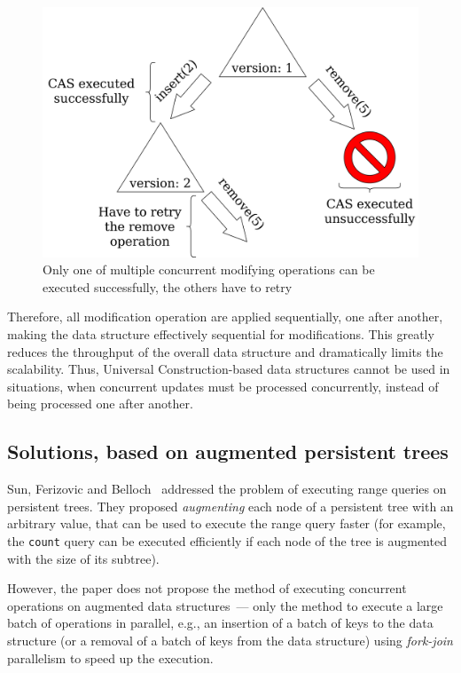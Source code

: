 \documentclass[times, dvipsnames,%
               languages={russian,english} %
              ]{itmo-student-thesis}
\begin{document}
\begin{figure}[H]
  \centering
  \caption{Only one of multiple concurrent modifying operations can be executed successfully, the others have to retry}
  \label{universal-retry-pic}
  \includegraphics[width=\linewidth]{pics/universal-retry.png}
\end{figure}

Therefore, all modification operation are applied sequentially, one after another, making the data structure effectively sequential for modifications. This greatly reduces the throughput of the overall data structure and dramatically limits the scalability. Thus, Universal Construction-based data structures cannot be used in situations, when concurrent updates must be processed concurrently, instead of being processed one after another.

\subsection{Solutions, based on augmented persistent trees}

Sun, Ferizovic and Belloch~\cite{sun2018pam} addressed the problem of executing range queries on persistent trees. They proposed \emph{augmenting} each node of a persistent tree with an arbitrary value, that can be used to execute the range query faster (for example, the \texttt{count} query can be executed efficiently if each node of the tree is augmented with the size of its subtree).

However, the paper does not propose the method of executing concurrent operations on augmented data structures~--- only the method to execute a large batch of operations in parallel, e.g., an insertion of a batch of keys to the data structure (or a removal of a batch of keys from the data structure) using \emph{fork-join} parallelism to speed up the execution.
\end{document}
